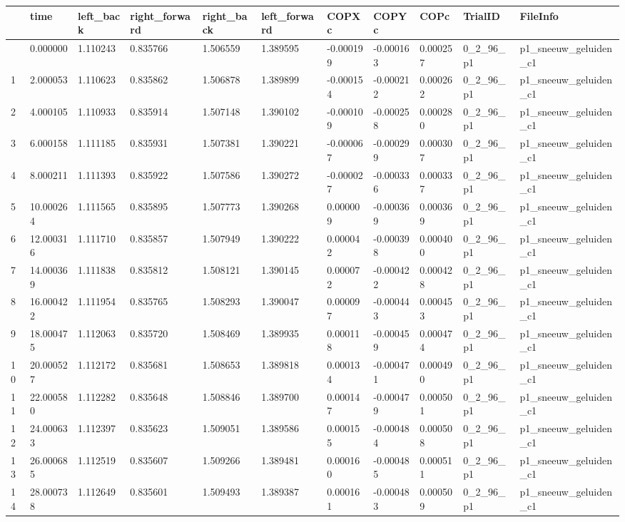 \documentclass[
  letterpaper,
  DIV=11,
  numbers=noendperiod]{scrreprt}
\begin{document}
\begin{longtable}[]{@{}lllllllllll@{}}
\toprule\noalign{}
& time & left\_back & right\_forward & right\_back & left\_forward &
COPXc & COPYc & COPc & TrialID & FileInfo \\
\midrule\noalign{}
\endhead
\bottomrule\noalign{}
\endlastfoot
0 & 0.000000 & 1.110243 & 0.835766 & 1.506559 & 1.389595 & -0.000199 &
-0.000163 & 0.000257 & 0\_2\_96\_p1 & p1\_sneeuw\_geluiden\_c1 \\
1 & 2.000053 & 1.110623 & 0.835862 & 1.506878 & 1.389899 & -0.000154 &
-0.000212 & 0.000262 & 0\_2\_96\_p1 & p1\_sneeuw\_geluiden\_c1 \\
2 & 4.000105 & 1.110933 & 0.835914 & 1.507148 & 1.390102 & -0.000109 &
-0.000258 & 0.000280 & 0\_2\_96\_p1 & p1\_sneeuw\_geluiden\_c1 \\
3 & 6.000158 & 1.111185 & 0.835931 & 1.507381 & 1.390221 & -0.000067 &
-0.000299 & 0.000307 & 0\_2\_96\_p1 & p1\_sneeuw\_geluiden\_c1 \\
4 & 8.000211 & 1.111393 & 0.835922 & 1.507586 & 1.390272 & -0.000027 &
-0.000336 & 0.000337 & 0\_2\_96\_p1 & p1\_sneeuw\_geluiden\_c1 \\
5 & 10.000264 & 1.111565 & 0.835895 & 1.507773 & 1.390268 & 0.000009 &
-0.000369 & 0.000369 & 0\_2\_96\_p1 & p1\_sneeuw\_geluiden\_c1 \\
6 & 12.000316 & 1.111710 & 0.835857 & 1.507949 & 1.390222 & 0.000042 &
-0.000398 & 0.000400 & 0\_2\_96\_p1 & p1\_sneeuw\_geluiden\_c1 \\
7 & 14.000369 & 1.111838 & 0.835812 & 1.508121 & 1.390145 & 0.000072 &
-0.000422 & 0.000428 & 0\_2\_96\_p1 & p1\_sneeuw\_geluiden\_c1 \\
8 & 16.000422 & 1.111954 & 0.835765 & 1.508293 & 1.390047 & 0.000097 &
-0.000443 & 0.000453 & 0\_2\_96\_p1 & p1\_sneeuw\_geluiden\_c1 \\
9 & 18.000475 & 1.112063 & 0.835720 & 1.508469 & 1.389935 & 0.000118 &
-0.000459 & 0.000474 & 0\_2\_96\_p1 & p1\_sneeuw\_geluiden\_c1 \\
10 & 20.000527 & 1.112172 & 0.835681 & 1.508653 & 1.389818 & 0.000134 &
-0.000471 & 0.000490 & 0\_2\_96\_p1 & p1\_sneeuw\_geluiden\_c1 \\
11 & 22.000580 & 1.112282 & 0.835648 & 1.508846 & 1.389700 & 0.000147 &
-0.000479 & 0.000501 & 0\_2\_96\_p1 & p1\_sneeuw\_geluiden\_c1 \\
12 & 24.000633 & 1.112397 & 0.835623 & 1.509051 & 1.389586 & 0.000155 &
-0.000484 & 0.000508 & 0\_2\_96\_p1 & p1\_sneeuw\_geluiden\_c1 \\
13 & 26.000685 & 1.112519 & 0.835607 & 1.509266 & 1.389481 & 0.000160 &
-0.000485 & 0.000511 & 0\_2\_96\_p1 & p1\_sneeuw\_geluiden\_c1 \\
14 & 28.000738 & 1.112649 & 0.835601 & 1.509493 & 1.389387 & 0.000161 &
-0.000483 & 0.000509 & 0\_2\_96\_p1 & p1\_sneeuw\_geluiden\_c1 \\
\end{longtable}
\end{document}
